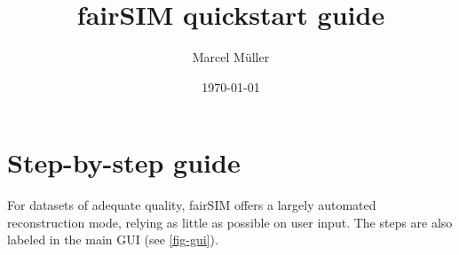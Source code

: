 \documentclass[twoside=false,
           twocolumn=false,
           a4paper,DIV=15,
           10pt]{scrartcl}
\author{\small{Marcel Müller}}
\title{fairSIM quickstart guide}
\date{\small \today}
\begin{document}
\maketitle


\tableofcontents
\newpage



\section{Step-by-step guide}

For datasets of adequate quality, fairSIM offers a
largely automated reconstruction mode, relying as little as
possible on user input. The steps are also labeled in the main
GUI (see \cref{fig-gui}). 
\end{document}
